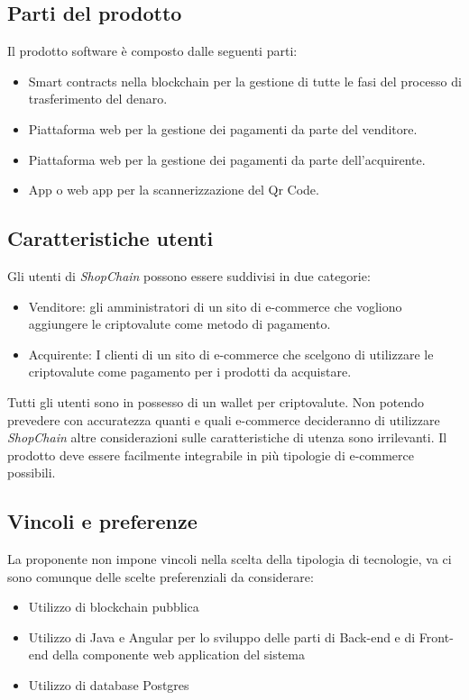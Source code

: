 \documentclass[a4paper, 12pt]{article}
\begin{document}
\subsection{Parti del prodotto}
Il prodotto software è composto dalle seguenti parti:
\begin{itemize}
\item Smart contracts nella blockchain per la gestione di tutte le fasi del processo di trasferimento del denaro.
\item Piattaforma web per la gestione dei pagamenti da parte del venditore.
\item Piattaforma web per la gestione dei pagamenti da parte dell'acquirente.
\item App o web app per la scannerizzazione del Qr Code.
\end{itemize}
\subsection{Caratteristiche utenti}
Gli utenti di \textit{ShopChain} possono essere suddivisi in due categorie:
\begin{itemize}
\item Venditore: gli amministratori di un sito di e-commerce che vogliono aggiungere le criptovalute come metodo di pagamento.
\item Acquirente: I clienti di un sito di e-commerce che scelgono di utilizzare le criptovalute come pagamento per i prodotti da acquistare.
\end{itemize}
Tutti gli utenti sono in possesso di un wallet per criptovalute. 
Non potendo prevedere con accuratezza quanti e quali e-commerce decideranno di utilizzare \textit{ShopChain} altre considerazioni sulle caratteristiche di utenza sono irrilevanti. Il prodotto deve essere facilmente integrabile in più tipologie di e-commerce possibili.

\subsection{Vincoli e preferenze}
La proponente non impone vincoli nella scelta della tipologia di tecnologie, va ci sono comunque delle scelte preferenziali da considerare:
\begin{itemize}
\item Utilizzo di blockchain pubblica
\item Utilizzo di Java e Angular per lo sviluppo delle parti di Back-end e di Front-end della componente web application del sistema
\item Utilizzo di database Postgres
\end{itemize}
\end{document}
